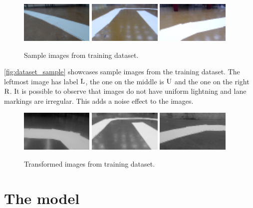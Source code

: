\begin{figure}[h]
  \centering\includegraphics[width=0.31\textwidth]{imgs/sample_left.png}
  \includegraphics[width=0.31\textwidth]{imgs/sample_up.png}
  \includegraphics[width=0.31\textwidth]{imgs/sample_right.png}
  \caption{Sample images from training dataset.\label{fig:dataset_sample}}
\end{figure}

\autoref{fig:dataset_sample} showcases sample images from the training dataset. The leftmost image
has label $\text{L}$, the one on the middle is $\text{U}$ and the one on the right $\text{R}$. It is possible
to observe that images do not have uniform lightning and lane markings are irregular. This adds a
noise effect to the images.

\begin{figure}[h]
  \centering\includegraphics[width=0.31\textwidth]{imgs/trans_left.png}
  \includegraphics[width=0.31\textwidth]{imgs/trans_up.png}
  \includegraphics[width=0.31\textwidth]{imgs/trans_right.png}
  \caption{Transformed images from training dataset.\label{fig:dataset_sample}}
\end{figure}

\section{The model}


